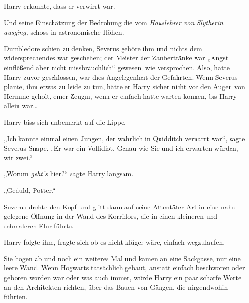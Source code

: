 Harry erkannte, dass er verwirrt war.

Und seine Einschätzung der Bedrohung die vom \emph{Hauslehrer von Slytherin ausging,} schoss in astronomische Höhen.

Dumbledore schien zu denken, Severus gehöre ihm und nichts dem widersprechendes war geschehen; der Meister der Zaubertränke war „Angst einflößend aber nicht missbräuchlich“ gewesen, wie versprochen. Also, hatte Harry zuvor geschlossen, war dies Angelegenheit der Gefährten. Wenn Severus plante, ihm etwas zu leide zu tun, hätte er Harry sicher nicht vor den Augen von Hermine geholt, einer Zeugin, wenn er einfach hätte warten können, bis Harry allein war…

Harry biss sich unbemerkt auf die Lippe.

„Ich kannte einmal einen Jungen, der wahrlich in Quidditch vernarrt war“, sagte Severus Snape. „Er war ein Vollidiot. Genau wie Sie und ich erwarten würden, wir zwei.“

„Worum \emph{geht’s} hier?“ sagte Harry langsam.

„Geduld, Potter.“

Severus drehte den Kopf und glitt dann auf seine Attentäter-Art in eine nahe gelegene Öffnung in der Wand des Korridors, die in einen kleineren und schmaleren Flur führte.

Harry folgte ihm, fragte sich ob es nicht klüger wäre, einfach wegzulaufen.

Sie bogen ab und noch ein weiteres Mal und kamen an eine Sackgasse, nur eine leere Wand. Wenn Hogwarts tatsächlich gebaut, anstatt einfach beschworen oder geboren worden war oder was auch immer, würde Harry ein paar scharfe Worte an den Architekten richten, über das Bauen von Gängen, die nirgendwohin führten.

